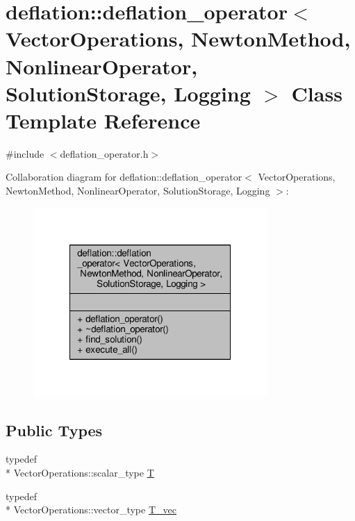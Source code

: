 \hypertarget{classdeflation_1_1deflation__operator}{\section{deflation\-:\-:deflation\-\_\-operator$<$ Vector\-Operations, Newton\-Method, Nonlinear\-Operator, Solution\-Storage, Logging $>$ Class Template Reference}
\label{classdeflation_1_1deflation__operator}
}


{\ttfamily \#include $<$deflation\-\_\-operator.\-h$>$}



Collaboration diagram for deflation\-:\-:deflation\-\_\-operator$<$ Vector\-Operations, Newton\-Method, Nonlinear\-Operator, Solution\-Storage, Logging $>$\-:\nopagebreak
\begin{figure}[H]
\begin{center}
\leavevmode
\includegraphics[width=252pt]{classdeflation_1_1deflation__operator__coll__graph}
\end{center}
\end{figure}
\subsection*{Public Types}
\begin{DoxyCompactItemize}
\item 
typedef \\*
Vector\-Operations\-::scalar\-\_\-type \hyperlink{classdeflation_1_1deflation__operator_a16b4c1329afeb50d9477f1094df943b9}{T}
\item 
typedef \\*
Vector\-Operations\-::vector\-\_\-type \hyperlink{classdeflation_1_1deflation__operator_ac7800761f41ffb590968f434afd25985}{T\-\_\-vec}
\end{DoxyCompactItemize}
